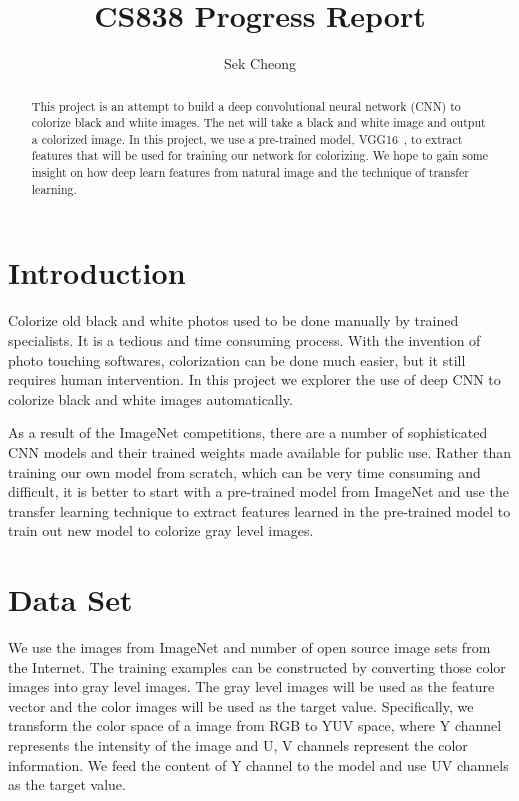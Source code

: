 \documentclass[12pt]{article}
\begin{document}
\title{CS838 Progress Report}
\author{Sek Cheong}
\maketitle

\begin{abstract}
This project is an attempt to build a deep convolutional neural network (CNN) to colorize black and white images. The net will take a black and white image and output a colorized image. In this project, we use a pre-trained model, VGG16~\cite{vgg16}, to extract features that will be used for training our network for colorizing. We hope to gain some insight on how deep learn features from natural image and the technique of transfer learning.
\end{abstract}

\section{Introduction}
Colorize old black and white photos used to be done manually by trained specialists. It is a tedious and time consuming process. With the invention of photo touching softwares, colorization can be done much easier, but it still requires human intervention. In this project we explorer the use of deep CNN to colorize black and white images automatically. 


As a result of the ImageNet competitions, there are a number of sophisticated CNN models and their trained weights made available for public use. Rather than training our own model from scratch, which can be very time consuming and difficult, it is better to start with a pre-trained model from ImageNet and use the transfer learning technique to extract features learned in the pre-trained model to train out new model to colorize gray level images.


\section{Data Set}
We use the images from ImageNet and number of open source image sets from the Internet. The training examples can be constructed by converting those color images into gray level images. The gray level images will be used as the feature vector and the color images will be used as the target value. Specifically, we transform the color space of a image from RGB to YUV space, where Y channel represents the intensity of the image and U, V channels represent the color information. We feed the content of Y channel to the model and use UV channels as the target value. 
\end{document}
